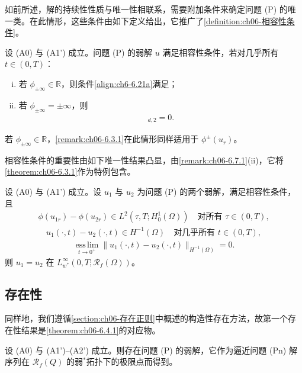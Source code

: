 \documentclass[../../main.tex]{subfiles}%
\begin{document}
如前所述，解的持续性性质与唯一性相联系，需要附加条件来确定问题 (P) 的唯一类。在此情形，这些条件由如下定义给出，它推广了\cref{definition:ch06-相容性条件}。

\begin{definition}\label{definition:ch06-无界相容性}
设 (A0) 与 (A1') 成立。问题 (P) 的弱解 $u$ 满足相容性条件，若对几乎所有 $t\in(0,T)$：
\begin{enumerate}[(i)]
\item 若 $\phi_{\pm\infty}\in\mathbb{R}$，则条件\eqref{align:ch6-6.21a}满足；
\item 若 $\phi_{\pm\infty}=\pm\infty$，则
\begin{align}
[u^\pm_s(\cdot,t)]_{d,2}=0. \label{align:ch6-6.137}
\end{align}
\end{enumerate}
若 $\phi_{\pm\infty}\in\mathbb{R}$，\cref{remark:ch06-6.3.1}在此情形同样适用于 $\phi^\pm(u_r)$。
\end{definition}

相容性条件的重要性由如下唯一性结果凸显，由\cref{remark:ch06-6.7.1}(ii)，它将\cref{theorem:ch06-6.3.1}作为特例包含。

\begin{theorem}\label{theorem:ch06-6.7.2}
设 (A0) 与 (A1') 成立。设 $u_1$ 与 $u_2$ 为问题 (P) 的两个弱解，满足相容性条件，且
\begin{align}
\phi(u_{1r})-\phi(u_{2r})\in L^2(\tau,T;H^1_0(\Omega)) \quad\text{对所有 }\tau\in(0,T), \label{align:ch6-6.138a}
\end{align}
\begin{align}
u_1(\cdot,t)-u_2(\cdot,t)\in H^{-1}(\Omega) \quad\text{对几乎所有 }t\in(0,T), \label{align:ch6-6.138b}
\end{align}
\begin{align}
\operatorname*{ess\,lim}_{t\to0^+}\|u_1(\cdot,t)-u_2(\cdot,t)\|_{H^{-1}(\Omega)}=0. \label{align:ch6-6.138c}
\end{align}
则 $u_1=u_2$ 在 $L^\infty_{w^*}(0,T;\mathscr{R}_f(\Omega))$。
\end{theorem}

\subsection{存在性}\label{subsection:ch06-无界存在}

同样地，我们遵循\cref{section:ch06-存在正则}中概述的构造性存在方法，故第一个存在性结果是\cref{theorem:ch06-6.4.1}的对应物。

\begin{theorem}\label{theorem:ch06-6.7.3}
设 (A0) 与 (A1')--(A2') 成立。则存在问题 (P) 的弱解，它作为逼近问题 (Pn) 解序列在 $\mathscr{R}_f(Q)$ 的弱$^*$拓扑下的极限点而得到。
\end{theorem}
\end{document}
